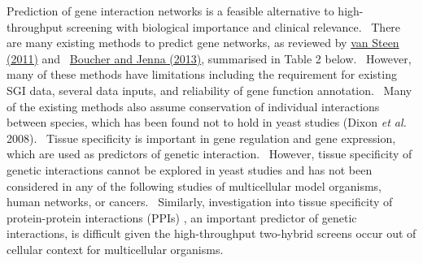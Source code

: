 Prediction of gene interaction networks is a feasible alternative to high-throughput screening with biological importance and clinical relevance. \ There are many existing methods to predict gene networks, as reviewed by \hyperlink{ENREF104}{van Steen (2011)} and \ \hyperlink{ENREF16}{Boucher and Jenna (2013)}, summarised in Table 2 below. \ However, many of these methods have limitations including the requirement for existing SGI data, several data inputs, and reliability of gene function annotation. \ Many of the existing methods also assume conservation of individual interactions between species, which has been found not to hold in yeast studies (Dixon\textit{ et al.} 2008). \ Tissue specificity is important in gene regulation and gene expression, which are used as predictors of genetic interaction. \ However, tissue specificity of genetic interactions cannot be explored in yeast studies and has not been considered in any of the following studies of multicellular model organisms, human networks, or cancers. \ Similarly, investigation into tissue specificity of protein-protein interactions (PPIs) , an important predictor of genetic interactions, is difficult given the high-throughput two-hybrid screens occur out of cellular context for multicellular organisms. \  

